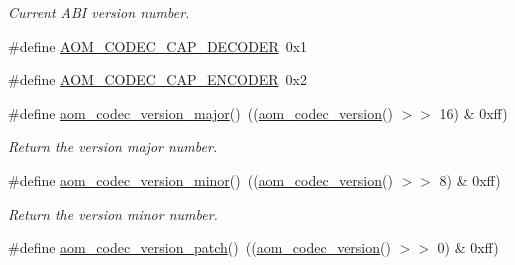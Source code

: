 \begin{DoxyCompactItemize}
\begin{DoxyCompactList}\small\item\em Current A\+BI version number. \end{DoxyCompactList}\item 
\#define \hyperlink{group__codec_gad362e3d79e8520028c790659c1c77174}{A\+O\+M\+\_\+\+C\+O\+D\+E\+C\+\_\+\+C\+A\+P\+\_\+\+D\+E\+C\+O\+D\+ER}~0x1
\item 
\#define \hyperlink{group__codec_ga59ba7a82c1363e296a0a4db618d4099a}{A\+O\+M\+\_\+\+C\+O\+D\+E\+C\+\_\+\+C\+A\+P\+\_\+\+E\+N\+C\+O\+D\+ER}~0x2
\item 
\#define \hyperlink{group__codec_gaf35aecefb8133a5474d0068119e6182c}{aom\+\_\+codec\+\_\+version\+\_\+major}()~((\hyperlink{group__codec_gaaed56af63c70186d571ab44c72500e77}{aom\+\_\+codec\+\_\+version}() $>$$>$ 16) \& 0xff)\hypertarget{group__codec_gaf35aecefb8133a5474d0068119e6182c}{}\label{group__codec_gaf35aecefb8133a5474d0068119e6182c}

\begin{DoxyCompactList}\small\item\em Return the version major number. \end{DoxyCompactList}\item 
\#define \hyperlink{group__codec_gafc4f21abef83316131df07742b919d91}{aom\+\_\+codec\+\_\+version\+\_\+minor}()~((\hyperlink{group__codec_gaaed56af63c70186d571ab44c72500e77}{aom\+\_\+codec\+\_\+version}() $>$$>$ 8) \& 0xff)\hypertarget{group__codec_gafc4f21abef83316131df07742b919d91}{}\label{group__codec_gafc4f21abef83316131df07742b919d91}

\begin{DoxyCompactList}\small\item\em Return the version minor number. \end{DoxyCompactList}\item 
\#define \hyperlink{group__codec_gaf452ede024bf9a378fa66443494070ba}{aom\+\_\+codec\+\_\+version\+\_\+patch}()~((\hyperlink{group__codec_gaaed56af63c70186d571ab44c72500e77}{aom\+\_\+codec\+\_\+version}() $>$$>$ 0) \& 0xff)\hypertarget{group__codec_gaf452ede024bf9a378fa66443494070ba}{}\label{group__codec_gaf452ede024bf9a378fa66443494070ba}


\end{DoxyCompactItemize}
